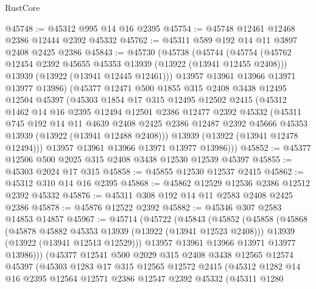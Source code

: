 \begin{lexlean}{RustCore}
\begin{coremodule}
@45748 := @45312 @995 @14 @16 @2395
@45754 := @45748 @12461 @12468 @2386 @12444 @2392 @45332
@45762 := @45311 @589 @192 @14 @11 @3897 @2408 @2425 @2386
@45843 := @45730
    (@45738
      (@45744
        (@45754
          (@45762 @12454 @2392 @45655 @45353 @13939 (@13922 (@13941 @12455 @2408)))
          @13939
          (@13922 (@13941 @12445 @12461)))
        @13957
        @13961
        @13966
        @13971
        @13977
        @13986)
      (@45377
        @12471
        @500
        @1855
        @315
        @2408
        @3438
        @12495
        @12504
        @45397
        (@45303
          @1854
          @17
          @315
          @12495
          @12502
          @2415
          (@45312
            @1462
            @14
            @16
            @2395
            @12494
            @12501
            @2386
            @12477
            @2392
            @45332
            (@45311
              @745
              @192
              @14
              @11
              @4639
              @2408
              @2425
              @2386
              @12487
              @2392
              @45666
              @45353
              @13939
              (@13922 (@13941 @12488 @2408)))
            @13939
            (@13922 (@13941 @12478 @12494)))
          @13957
          @13961
          @13966
          @13971
          @13977
          @13986)))
@45852 := @45377 @12506 @500 @2025 @315 @2408 @3438 @12530 @12539 @45397
@45855 := @45303 @2024 @17 @315
@45858 := @45855 @12530 @12537 @2415
@45862 := @45312 @310 @14 @16 @2395
@45868 := @45862 @12529 @12536 @2386 @12512 @2392 @45332
@45876 := @45311 @308 @192 @14 @11 @2583 @2408 @2425 @2386
@45878 := @45876 @12522 @2392
@45882 := @45346 @307 @2583 @14853 @14857
@45967 := @45714
    (@45722
      (@45843
        (@45852
          (@45858
            (@45868
              (@45878 @45882 @45353 @13939 (@13922 (@13941 @12523 @2408)))
              @13939
              (@13922 (@13941 @12513 @12529)))
            @13957
            @13961
            @13966
            @13971
            @13977
            @13986)))
      (@45377
        @12541
        @500
        @2029
        @315
        @2408
        @3438
        @12565
        @12574
        @45397
        (@45303
          @1283
          @17
          @315
          @12565
          @12572
          @2415
          (@45312
            @1282
            @14
            @16
            @2395
            @12564
            @12571
            @2386
            @12547
            @2392
            @45332
            (@45311
              @1280

\end{coremodule}
\end{lexlean}
